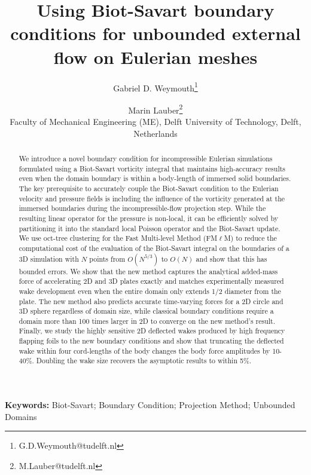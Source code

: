 \documentclass[11pt]{article}
\title{Using Biot-Savart boundary conditions for unbounded external flow on Eulerian meshes}
\author{Gabriel D. Weymouth\thanks{G.D.Weymouth@tudelft.nl} \and Marin Lauber\thanks{M.Lauber@tudelft.nl}\\[1ex]
\small Faculty of Mechanical Engineering (ME), Delft University of Technology, Delft, Netherlands}
\date{}
\begin{document}
\maketitle

\begin{abstract}
We introduce a novel boundary condition for incompressible Eulerian simulations formulated using a Biot-Savart vorticity integral that maintains high-accuracy results even when the domain boundary is within a body-length of immersed solid boundaries. The key prerequisite to accurately couple the Biot-Savart condition to the Eulerian velocity and pressure fields is including the influence of the vorticity generated at the immersed boundaries during the incompressible-flow projection step. While the resulting linear operator for the pressure is non-local, it can be efficiently solved by partitioning it into the standard local Poisson operator and the Biot-Savart update. We use oct-tree clustering for the Fast Multi-level Method (FM$\ell$M) to reduce the computational cost of the evaluation of the Biot-Savart integral on the boundaries of a 3D simulation with $N$ points from $O(N^{5/3})$ to $O(N)$ and show that this has bounded errors. We show that the new method captures the analytical added-mass force of accelerating 2D and 3D plates exactly and matches experimentally measured wake development even when the entire domain only extends 1/2 diameter from the plate. The new method also predicts accurate time-varying forces for a 2D circle and 3D sphere regardless of domain size, while classical boundary conditions require a domain more than 100 times larger in 2D to converge on the new method's result. Finally, we study the highly sensitive 2D deflected wakes produced by high frequency flapping foils to the new boundary conditions and show that truncating the deflected wake within four cord-lengths of the body changes the body force amplitudes by 10-40\%. Doubling the 
wake size recovers the asymptotic results to within 5\%. 
\end{abstract}

\noindent\textbf{Keywords:} Biot-Savart; Boundary Condition; Projection Method; Unbounded Domains



\end{document}
